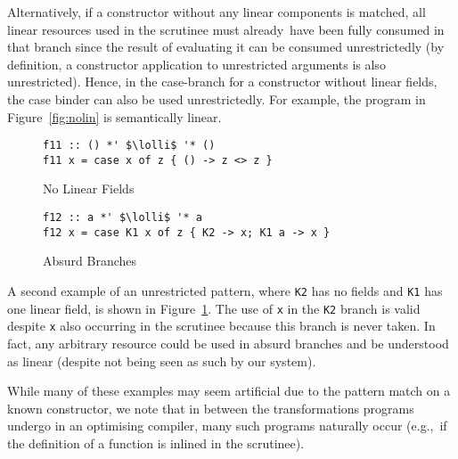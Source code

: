 \documentclass[acmsmall,review,screen]{acmart}
\newcommand{\incode}[1]{\lstinline{#1}}
\newcommand{\lolli}{\multimap}
\newcommand{\ROUNDTWO}[1]{{\color{red}#1}}
\begin{document}
\ROUNDTWO{Alternatively}, if a constructor without any linear components \ROUNDTWO{is matched},
all linear resources used in the scrutinee must \ROUNDTWO{already} have been
fully consumed in that branch since the result of evaluating it can be consumed
unrestrictedly (by definition, a constructor application to unrestricted
arguments is also unrestricted).
%
Hence, in the \ROUNDTWO{case-}branch for a constructor without linear fields, the case
binder can also be used unrestrictedly. For example, the program in
Figure~\ref{fig:nolin} is semantically linear.
%
\begin{figure}[h]
 \begin{minipage}{0.5\textwidth}
\begin{notyet}
\begin{lstlisting}
f11 :: () *' $\lolli$ '* ()
f11 x = case x of z { () -> z <> z }
\end{lstlisting}
\end{notyet}
\vspace{-0.5cm}
\caption{No Linear Fields\label{fig:nolin}}
\end{minipage}%
\begin{minipage}{0.5\textwidth}
\begin{limitation}
\begin{lstlisting}
f12 :: a *' $\lolli$ '* a
f12 x = case K1 x of z { K2 -> x; K1 a -> x }
\end{lstlisting}
\end{limitation}
\vspace{-0.5cm}
\caption{Absurd Branches\label{fig:absurd}}
\end{minipage}
\end{figure}
%
A second example of an unrestricted pattern, where \incode{K2} has no fields
and \incode{K1} has one linear field, is shown in Figure~\ref{fig:absurd}.
The use of \incode{x} in the \incode{K2} branch is valid despite \incode{x}
also occurring in the scrutinee because this branch is never taken. In fact,
any arbitrary resource could be used in absurd branches and be understood as
linear (despite not being seen as such by our system).

While many of these examples may seem artificial due to the pattern match on a
known constructor, we note that in between the transformations programs
undergo in an optimising compiler, many such programs naturally occur (e.g.,~if
the definition of a function is inlined in the scrutinee).
%
\end{document}
